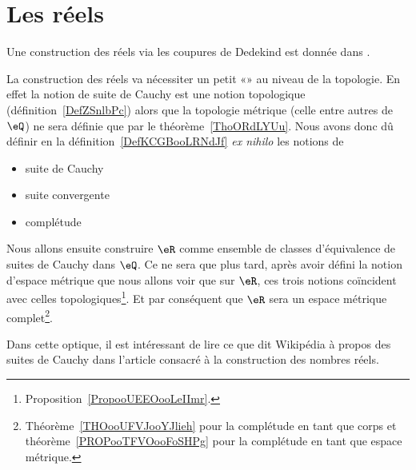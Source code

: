 
\section{Les réels}

Une construction des réels via les coupures de Dedekind est donnée dans \cite{PaulinTopGmVegN}.

\begin{normaltext}      \label{NormooHRDZooRGGtCd}
	La construction des réels va nécessiter un petit «» au niveau de la topologie. En effet la notion de suite de Cauchy est une notion topologique (définition~\ref{DefZSnlbPc}) alors que la topologie métrique (celle entre autres de \( \eQ\)) ne sera définie que par le théorème~\ref{ThoORdLYUu}. Nous avons donc dû définir en la définition~\ref{DefKCGBooLRNdJf} \emph{ex nihilo} les notions de
	\begin{itemize}
		\item
		      suite de Cauchy
		\item
		      suite convergente
		\item
		      complétude
	\end{itemize}
	Nous allons ensuite construire \( \eR\) comme ensemble de classes d'équivalence de suites de Cauchy dans \( \eQ\). Ce ne sera que plus tard, après avoir défini la notion d'espace métrique que nous allons voir que sur \( \eR\), ces trois notions coïncident avec celles topologiques\footnote{Proposition~\ref{PropooUEEOooLeIImr}.}. Et par conséquent que \( \eR\) sera un espace métrique complet\footnote{Théorème~\ref{THOooUFVJooYJlieh} pour la complétude en tant que corps et théorème~\ref{PROPooTFVOooFoSHPg} pour la complétude en tant que espace métrique.}.

	Dans cette optique, il est intéressant de lire ce que dit Wikipédia à propos des suites de Cauchy dans l'article consacré à la construction des nombres réels\cite{BIBooPIGUooHzurMI}.
\end{normaltext}

